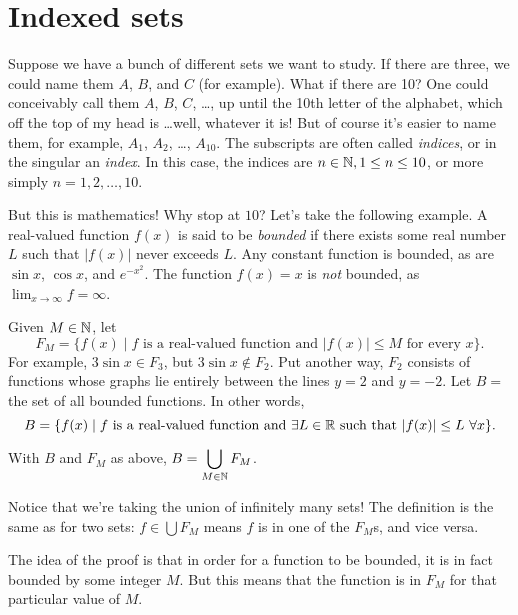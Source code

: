 \documentclass{tufte-book}
\begin{document}


\section{Indexed sets}
\label{sec:indexed-sets}

Suppose we have a bunch of different sets we want to study. If there are three, we could name them $A$, $B$, and $C$ (for example). What if there are 10? One could conceivably call them $A$, $B$, $C$, \dots, up until the 10th letter of the alphabet, which off the top of my head is \dots well, whatever it is! But of course it's easier to name them, for example, $A_1$, $A_2$, \dots, $A_{10}$. The subscripts are often called \emph{indices}, or in the singular an \emph{index}. In this case, the indices are $n \in \mathbb{N}, 1 \leq n \leq 10$, or more simply $n = 1, 2, \dots, 10$.

But this is mathematics! Why stop at $10$? Let's take the following example. A real-valued function $f(x)$ is said to be \emph{bounded} if there exists some real number $L$ such that $|f(x)|$ never exceeds $L$. Any constant function is bounded, as are $\sin x$, $\cos x$, and $e^{-x^2}$. The function $f(x) = x$ is \emph{not} bounded, as $\lim_{x \to \infty} f = \infty$.

Given $M \in \mathbb{N}$, let 
\[
F_M = \{f(x) \mid f \text{ is a real-valued function and } |f(x)| \leq M \text{ for every } x\}.
\]
For example, $3\sin x \in F_3$, but $3\sin x \notin F_2$. Put another way, $F_2$ consists of functions whose graphs lie entirely between the lines $y = 2$ and $y = -2$. Let $B = $ the set of all bounded functions. In other words,
\[
B = \{f(x) \mid f \text{ is a real-valued function and } \exists L \in \mathbb{R} \text{ such that } |f(x)| \leq L \, \, \forall x\}.
\]

\begin{claim}
  With $B$ and $F_M$ as above, $B = \displaystyle\bigcup_{M \in \mathbb{N}} F_M$. 
\end{claim}
Notice that we're taking the union of infinitely many sets! The definition is the same as for two sets: $f \in \bigcup F_M$ means $f$ is in one of the $F_M$s, and vice versa.

The idea of the proof is that in order for a function to be bounded, it is in fact bounded by some integer $M$. But this means that the function is in $F_M$ for that particular value of $M$. 
\end{document}
